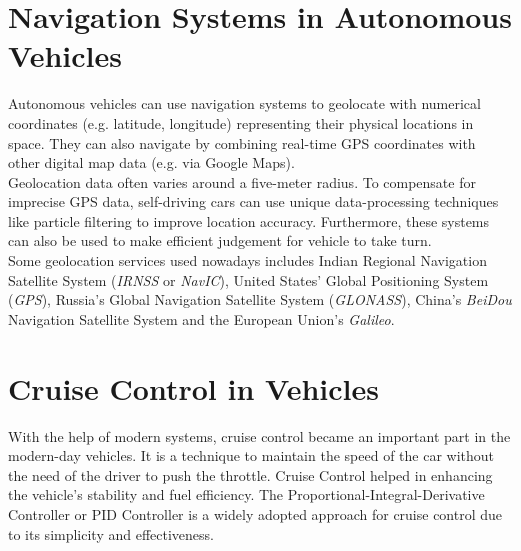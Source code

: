 \section{Navigation Systems in Autonomous Vehicles}
Autonomous vehicles can use navigation systems to geolocate with numerical coordinates (e.g. latitude, longitude) representing their physical locations in space. They can also navigate by combining real-time GPS coordinates with other digital map data (e.g. via Google Maps).
\\
Geolocation data often varies around a five-meter radius. To compensate for imprecise GPS data, self-driving cars can use unique data-processing techniques like particle filtering to improve location accuracy. Furthermore, these systems can also be used to make efficient judgement for vehicle to take turn.
\\
Some geolocation services used nowadays includes  Indian Regional Navigation Satellite System (\textit{IRNSS} or \textit{NavIC}), United States' Global Positioning System (\textit{GPS}), Russia's Global Navigation Satellite System (\textit{GLONASS}), China's \textit{BeiDou} Navigation Satellite System and the European Union's \textit{Galileo}.

\section{Cruise Control in Vehicles}
With the help of modern systems, cruise control became an important part in the modern-day vehicles. It is a technique to maintain the speed of the car without the need of the driver to push the throttle. Cruise Control helped in enhancing the vehicle's stability and fuel efficiency. The Proportional-Integral-Derivative Controller or PID Controller is a widely adopted approach for cruise control due to its simplicity and effectiveness.

